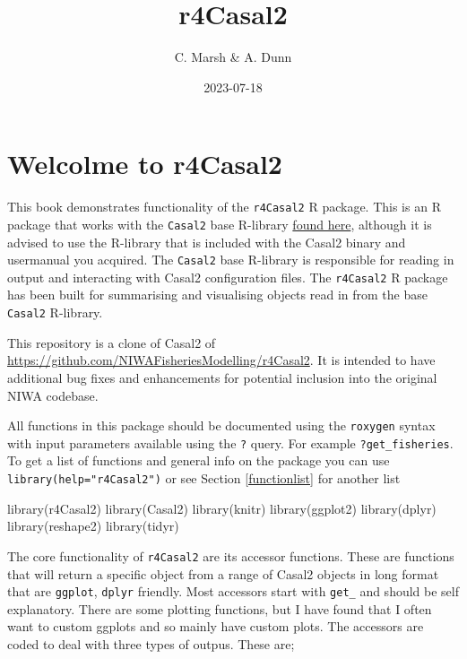 \documentclass[
]{book}
\title{r4Casal2}
\author{C. Marsh \& A. Dunn}
\date{2023-07-18}
\newenvironment{Shaded}{\begin{snugshade}}{\end{snugshade}}
\newcommand{\FunctionTok}[1]{\textcolor[rgb]{0.00,0.00,0.00}{#1}}
\newcommand{\NormalTok}[1]{#1}
\begin{document}
\maketitle

{
\setcounter{tocdepth}{1}
\tableofcontents
}
\hypertarget{welcolme-to-r4casal2}{%
\chapter{\texorpdfstring{Welcolme to \textbf{r4Casal2}}{Welcolme to r4Casal2}}\label{welcolme-to-r4casal2}}

This book demonstrates functionality of the \texttt{r4Casal2} R package. This is an R package that works with the \texttt{Casal2} base R-library \href{https://github.com/alistairdunn1/CASAL2/tree/master/R-libraries}{found here}, although it is advised to use the R-library that is included with the Casal2 binary and usermanual you acquired. The \texttt{Casal2} base R-library is responsible for reading in output and interacting with Casal2 configuration files. The \texttt{r4Casal2} R package has been built for summarising and visualising objects read in from the base \texttt{Casal2} R-library.

This repository is a clone of Casal2 of \url{https://github.com/NIWAFisheriesModelling/r4Casal2}. It is intended to have additional bug fixes and enhancements for potential inclusion into the original NIWA codebase.

All functions in this package should be documented using the \texttt{roxygen} syntax with input parameters available using the \texttt{?} query. For example \texttt{?get\_fisheries}. To get a list of functions and general info on the package you can use \texttt{library(help="r4Casal2")} or see Section \ref{functionlist} for another list

\begin{Shaded}
\begin{Highlighting}[]
\FunctionTok{library}\NormalTok{(r4Casal2)}
\FunctionTok{library}\NormalTok{(Casal2)}
\FunctionTok{library}\NormalTok{(knitr)}
\FunctionTok{library}\NormalTok{(ggplot2)}
\FunctionTok{library}\NormalTok{(dplyr)}
\FunctionTok{library}\NormalTok{(reshape2)}
\FunctionTok{library}\NormalTok{(tidyr)}
\end{Highlighting}
\end{Shaded}

The core functionality of \texttt{r4Casal2} are its accessor functions. These are functions that will return a specific object from a range of Casal2 objects in long format that are \texttt{ggplot}, \texttt{dplyr} friendly. Most accessors start with \texttt{get\_} and should be self explanatory. There are some plotting functions, but I have found that I often want to custom ggplots and so mainly have custom plots. The accessors are coded to deal with three types of outpus. These are;
\end{document}
